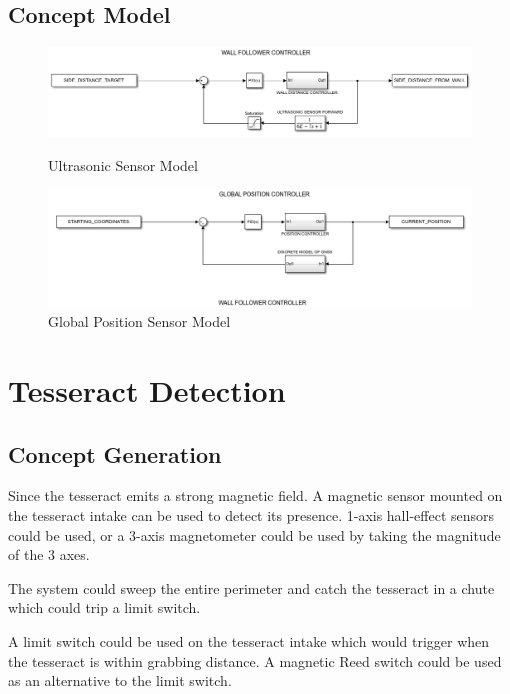 \documentclass[12pt]{article}
\begin{document}
\subsection{Concept Model}
\begin{figure}[htb!]
\begin{center}
\includegraphics[scale=0.7]{Figures/simulink_ultrasonic}
\caption{Ultrasonic Sensor Model}
\includegraphics[scale=0.7]{Figures/simulink_globalpos}
\caption{Global Position Sensor Model}
\end{center}
\end{figure}
\FloatBarrier

\section{Tesseract Detection}
\subsection{Concept Generation}
Since the tesseract emits a strong magnetic field. A magnetic sensor mounted on the tesseract intake can be used to detect its presence. 1-axis hall-effect sensors could be used, or a 3-axis magnetometer could be used by taking the magnitude of the 3 axes.

The system could sweep the entire perimeter and catch the tesseract in a chute which could trip a limit switch.

A limit switch could be used on the tesseract intake which would trigger when the tesseract is within grabbing distance. A magnetic Reed switch could be used as an alternative to the limit switch.
\end{document}

